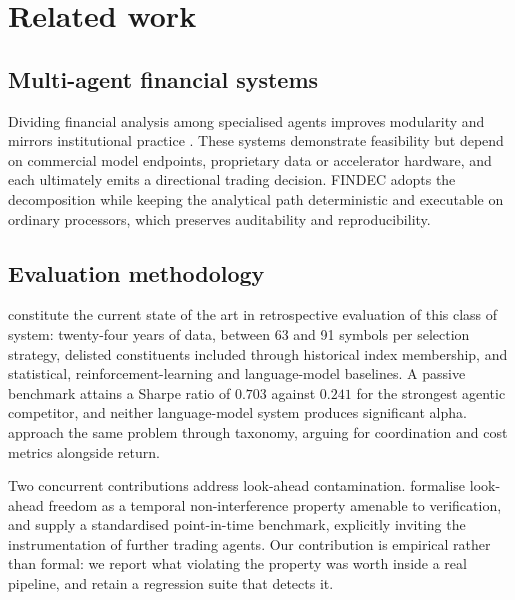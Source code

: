\documentclass[pdflatex,sn-apa]{sn-jnl}%
\theoremstyle{thmstyleone}%
\theoremstyle{thmstyletwo}%
\theoremstyle{thmstylethree}%
\begin{document}
\section{Related work}\label{sec:related}

\subsection{Multi-agent financial systems}\label{subsec:related-agents}

Dividing financial analysis among specialised agents improves modularity and
mirrors institutional practice \citep{xiao2024tradingagents,
yang2024finrobot, yang2023fingpt}. These systems demonstrate feasibility but
depend on commercial model endpoints, proprietary data or accelerator hardware,
and each ultimately emits a directional trading decision. FINDEC adopts the
decomposition while keeping the analytical path deterministic and executable on
ordinary processors, which preserves auditability and reproducibility.

\subsection{Evaluation methodology}\label{subsec:related-eval}

\citet{li2025finsaber} constitute the current state of the art in retrospective
evaluation of this class of system: twenty-four years of data, between 63 and
91 symbols per selection strategy, delisted constituents included through
historical index membership, and statistical, reinforcement-learning and
language-model baselines. A passive benchmark attains a Sharpe ratio of $0.703$
against $0.241$ for the strongest agentic competitor, and neither language-model
system produces significant alpha. \citet{nguyen2026reliable} approach the same
problem through taxonomy, arguing for coordination and cost metrics alongside
return.

Two concurrent contributions address look-ahead contamination.
\citet{fonseca2026lookahead} formalise look-ahead freedom as a temporal
non-interference property amenable to verification, and
\citet{benhenda2026lookaheadbench} supply a standardised point-in-time
benchmark, explicitly inviting the instrumentation of further trading agents.
Our contribution is empirical rather than formal: we report what violating the
property was worth inside a real pipeline, and retain a regression suite that
detects it.
\end{document}
